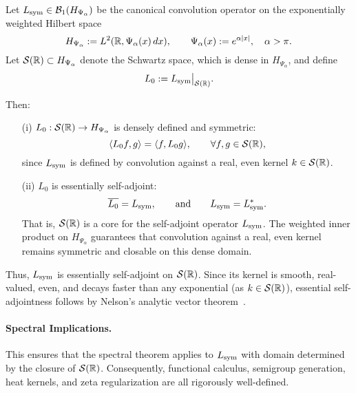 \begin{lemma}
\label{lem:core_essential_sa}
Let \( L_{\mathrm{sym}} \in \mathcal{B}_1(H_{\Psi_\alpha}) \) be the canonical convolution operator on the exponentially weighted Hilbert space
\[
H_{\Psi_\alpha} := L^2(\mathbb{R}, \Psi_\alpha(x)\, dx), \qquad \Psi_\alpha(x) := e^{\alpha |x|}, \quad \alpha > \pi.
\]
Let \( \mathcal{S}(\mathbb{R}) \subset H_{\Psi_\alpha} \) denote the Schwartz space, which is dense in \( H_{\Psi_\alpha} \), and define
\[
L_0 := L_{\mathrm{sym}} \big|_{\mathcal{S}(\mathbb{R})}.
\]

Then:
\begin{enumerate}
  \item[\textnormal{(i)}] \( L_0 : \mathcal{S}(\mathbb{R}) \to H_{\Psi_\alpha} \) is densely defined and symmetric:
  \[
  \langle L_0 f, g \rangle = \langle f, L_0 g \rangle, \qquad \forall f, g \in \mathcal{S}(\mathbb{R}),
  \]
  since \( L_{\mathrm{sym}} \) is defined by convolution against a real, even kernel \( k \in \mathcal{S}(\mathbb{R}) \).

  \item[\textnormal{(ii)}] \( L_0 \) is essentially self-adjoint:
  \[
  \overline{L_0} = L_{\mathrm{sym}}, \qquad \text{and} \qquad L_{\mathrm{sym}} = L_{\mathrm{sym}}^*.
  \]
  That is, \( \mathcal{S}(\mathbb{R}) \) is a core for the self-adjoint operator \( L_{\mathrm{sym}} \).
  The weighted inner product on \(H_{\Psi_\alpha}\) guarantees that convolution against a real, even kernel remains symmetric and closable on this dense domain.
\end{enumerate}

\medskip
\noindent
Thus, \( L_{\mathrm{sym}} \) is essentially self-adjoint on \( \mathcal{S}(\mathbb{R}) \). Since its kernel is smooth, real-valued, even, and decays faster than any exponential (as \( k \in \mathcal{S}(\mathbb{R}) \)), essential self-adjointness follows by Nelson’s analytic vector theorem~\cite[Thm.~X.36]{ReedSimon1975II}.

\paragraph{Spectral Implications.}
This ensures that the spectral theorem applies to \( L_{\mathrm{sym}} \) with domain determined by the closure of \( \mathcal{S}(\mathbb{R}) \). Consequently, functional calculus, semigroup generation, heat kernels, and zeta regularization are all rigorously well-defined.
\end{lemma}
